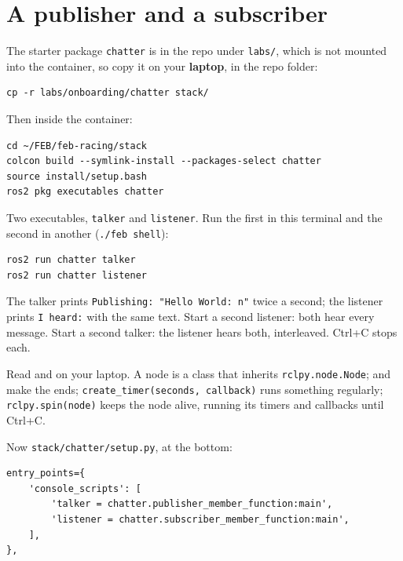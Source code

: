 \documentclass[11pt,a4paper]{article}
\begin{document}
\section{A publisher and a subscriber}

The starter package \texttt{chatter} is in the repo under \texttt{labs/}, which is not mounted
into the container, so copy it on your \textbf{laptop}, in the repo folder:

\begin{lstlisting}
cp -r labs/onboarding/chatter stack/
\end{lstlisting}

Then inside the container:

\begin{lstlisting}
cd ~/FEB/feb-racing/stack
colcon build --symlink-install --packages-select chatter
source install/setup.bash
ros2 pkg executables chatter
\end{lstlisting}

Two executables, \texttt{talker} and \texttt{listener}. Run the first in this terminal and the
second in another (\texttt{./feb shell}):

\begin{lstlisting}
ros2 run chatter talker
ros2 run chatter listener
\end{lstlisting}

The talker prints \texttt{Publishing: "Hello World: n"} twice a second; the listener prints
\texttt{I heard:} with the same text. Start a second listener: both hear every message. Start a
second talker: the listener hears both, interleaved. Ctrl+C stops each.

Read  and
 on your laptop. A node is a class that inherits
\texttt{rclpy.node.Node};  and
 make the ends;
\texttt{create\_timer(seconds, callback)} runs something regularly; \texttt{rclpy.spin(node)}
keeps the node alive, running its timers and callbacks until Ctrl+C.

Now \texttt{stack/chatter/setup.py}, at the bottom:

\begin{lstlisting}
entry_points={
    'console_scripts': [
        'talker = chatter.publisher_member_function:main',
        'listener = chatter.subscriber_member_function:main',
    ],
},
\end{lstlisting}
\end{document}
